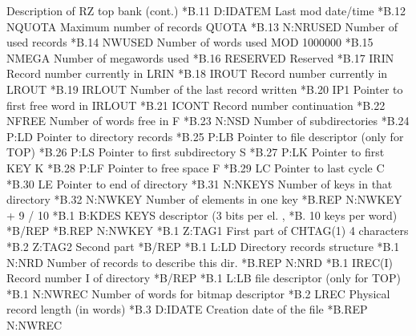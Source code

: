 \begin{XMPt}{Description of RZ top bank (cont.)}
*B.11    D:IDATEM      Last mod date/time                       
*B.12    NQUOTA        Maximum number of records QUOTA          
*B.13    N:NRUSED      Number of used records                   
*B.14    NWUSED        Number of words used MOD 1000000         
*B.15    NMEGA         Number of megawords used                 
*B.16    RESERVED      Reserved                        
*B.17    IRIN          Record number currently in LRIN          
*B.18    IROUT         Record number currently in LROUT         
*B.19    IRLOUT        Number of the last record written        
*B.20    IP1           Pointer to first free word in IRLOUT     
*B.21    ICONT         Record number continuation               
*B.22    NFREE         Number of words free in F                
*B.23    N:NSD         Number of subdirectories                 
*B.24    P:LD          Pointer to directory records             
*B.25    P:LB          Pointer to file descriptor (only for TOP)
*B.26    P:LS          Pointer to first subdirectory S          
*B.27    P:LK          Pointer to first KEY   K                 
*B.28    P:LF          Pointer to free space  F                 
*B.29    LC            Pointer to last cycle  C                 
*B.30    LE            Pointer to end of directory              
*B.31    N:NKEYS       Number of keys in that directory         
*B.32    N:NWKEY       Number of elements in one key 
*B.REP                 N:NWKEY + 9 / 10           
*B.1     B:KDES        KEYS descriptor (3 bits per el. ,
*B.                    10 keys per word) 
*B/REP    
*B.REP               N:NWKEY           
*B.1     Z:TAG1       First part of CHTAG(1) 4 characters      
*B.2     Z:TAG2       Second part                              
*B/REP    
*B.1     L:LD          Directory records structure
*B.1     N:NRD         Number of records to describe this dir.  
*B.REP               N:NRD           
*B.1     IREC(I)       Record number I of directory             
*B/REP
*B.1     L:LB          file descriptor (only for TOP)
*B.1     N:NWREC       Number of words for bitmap descriptor      
*B.2     LREC          Physical record length (in words)          
*B.3     D:IDATE       Creation date of the file                  
*B.REP               N:NWREC            
\end{XMPt}
